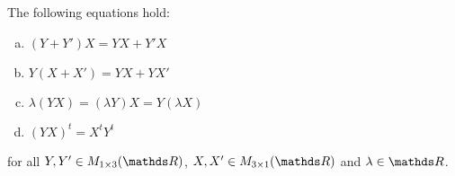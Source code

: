 \begin{prop}
	The following equations hold:
	\begin{enumerate}[a)]
		\item $(Y+Y')X=YX+Y'X$
		\item $Y(X+X')=YX+YX'$
		\item $\lambda(YX)=(\lambda Y)X=Y(\lambda X)$
		\item $(YX)^t=X^tY^t$
	\end{enumerate}for all $Y,Y'\in M_{1\times 3}(\R)$, $X,X'\in M_{3\times 1}(\R)$ and $\lambda\in \R$.
\end{prop}
